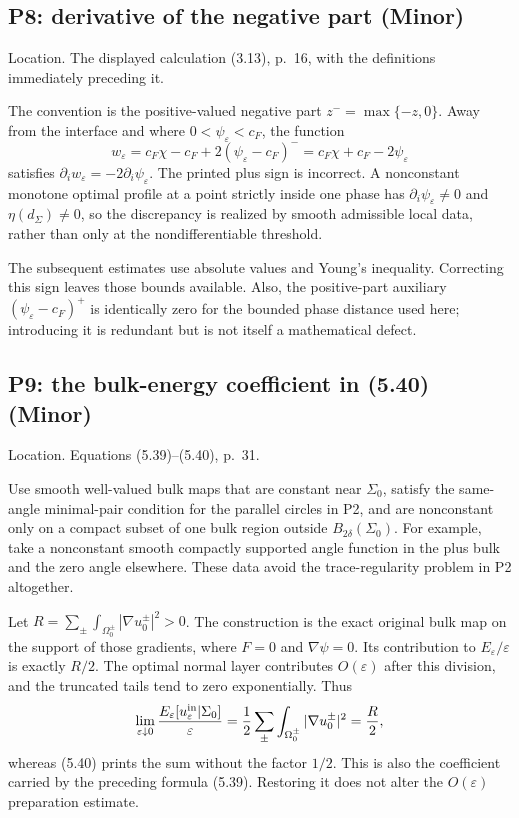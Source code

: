 \documentclass[10pt]{article}
\begin{document}
\subsection*{P8: derivative of the negative part (Minor)}
Location. The displayed calculation (3.13), p. 16, with the definitions immediately preceding it.\par
The convention is the positive-valued negative part \(z^-=\max\{-z,0\}\). Away from the interface and where \(0<\psi_\varepsilon<c_F\), the function \[w_\varepsilon=c_F\chi-c_F+2(\psi_\varepsilon-c_F)^-
        =c_F\chi+c_F-2\psi_\varepsilon\] satisfies \(\partial_iw_\varepsilon=-2\partial_i\psi_\varepsilon\). The printed plus sign is incorrect. A nonconstant monotone optimal profile at a point strictly inside one phase has \(\partial_i\psi_\varepsilon\neq0\) and \(\eta(d_\Sigma)\neq0\), so the discrepancy is realized by smooth admissible local data, rather than only at the nondifferentiable threshold.\par
The subsequent estimates use absolute values and Young’s inequality. Correcting this sign leaves those bounds available. Also, the positive-part auxiliary \((\psi_\varepsilon-c_F)^+\) is identically zero for the bounded phase distance used here; introducing it is redundant but is not itself a mathematical defect.\par
\subsection*{P9: the bulk-energy coefficient in (5.40) (Minor)}
Location. Equations (5.39)–(5.40), p. 31.\par
Use smooth well-valued bulk maps that are constant near \(\Sigma_0\), satisfy the same-angle minimal-pair condition for the parallel circles in P2, and are nonconstant only on a compact subset of one bulk region outside \(B_{2\delta}(\Sigma_0)\). For example, take a nonconstant smooth compactly supported angle function in the plus bulk and the zero angle elsewhere. These data avoid the trace-regularity problem in P2 altogether.\par
Let \(R=\sum_\pm\int_{\Omega_0^\pm}|\nabla u_0^\pm|^2>0\). The construction is the exact original bulk map on the support of those gradients, where \(F=0\) and \(\nabla\psi=0\). Its contribution to \(E_\varepsilon/\varepsilon\) is exactly \(R/2\). The optimal normal layer contributes \(O(\varepsilon)\) after this division, and the truncated tails tend to zero exponentially. Thus \[\lim_{\varepsilon\downarrow0}\frac{E_\varepsilon[u_\varepsilon^{\rm in}|\Sigma_0]}{\varepsilon}
    =\frac12\sum_\pm\int_{\Omega_0^\pm}
                  |\nabla u_0^\pm|^2
    =\frac R2,\] whereas (5.40) prints the sum without the factor \(1/2\). This is also the coefficient carried by the preceding formula (5.39). Restoring it does not alter the \(O(\varepsilon)\) preparation estimate.\par
\end{document}
